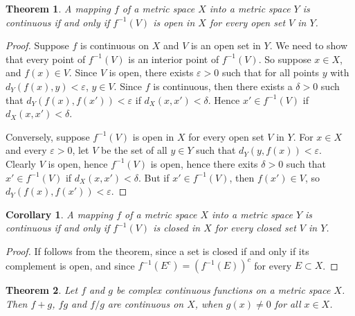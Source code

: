 \documentclass[11pt]{book}
\newtheorem{theorem}{Theorem}[chapter]
\newtheorem{corollary}{Corollary}[theorem]
\theoremstyle{definition}
\numberwithin{equation}{chapter}
\begin{document}
\medskip

\begin{theorem}\label{th_36}
A mapping $f$ of a metric space $X$ into a metric space $Y$ is continuous if and only if $f^{-1}(V)$ is open in $X$ for every open set $V$ in $Y$.
\end{theorem}
\begin{proof}
Suppose $f$ is continuous on $X$ and $V$ is an open set in $Y$. We need to show that every point of $f^{-1}(V)$ is an interior point of $f^{-1}(V)$. So suppose $x \in X$, and $f(x) \in V$. Since $V$ is open, there exists $\varepsilon > 0$ such that for all points $y$ with $d_Y(f(x),y) < \varepsilon$, $y \in V$. Since $f$ is continuous, then there exists a $\delta > 0$ such that $d_Y(f(x), f(x')) < \varepsilon$ if $d_X(x,x') < \delta$. Hence $x' \in f^{-1}(V)$ if $d_X(x,x') < \delta$.

Conversely, suppose $f^{-1}(V)$ is open in $X$ for every open set $V$ in $Y$. For $x \in X$ and every $\varepsilon > 0$, let $V$ be the set of all $y \in Y$ such that $d_Y(y,f(x)) < \varepsilon$. Clearly $V$ is open, hence $f^{-1}(V)$ is open, hence there exits $\delta > 0$ such that $x' \in f^{-1}(V)$ if $d_X(x,x') < \delta$. But if $x' \in f^{-1}(V)$, then $f(x') \in V$, so $d_Y(f(x), f(x')) < \varepsilon$.
\end{proof} 

\medskip

\begin{corollary}\label{coro_361}
A mapping $f$ of a metric space $X$ into a metric space $Y$ is continuous if and only if $f^{-1}(V)$ is closed in $X$ for every closed set $V$ in $Y$.
\end{corollary}
\begin{proof}
If follows from the theorem, since a set is closed if and only if its complement is open, and since $f^{-1}(E^c) = \left(f^{-1}(E)\right)^c$ for every $E \subset X$.
\end{proof}

\medskip

\begin{theorem}\label{th_37}
Let $f$ and $g$ be complex continuous functions on a metric space $X$. Then $f + g$, $fg$ and $f/g$ are continuous on $X$, when $g(x) \neq 0$ for all $x \in X$.
\end{theorem}

\medskip
\end{document}
